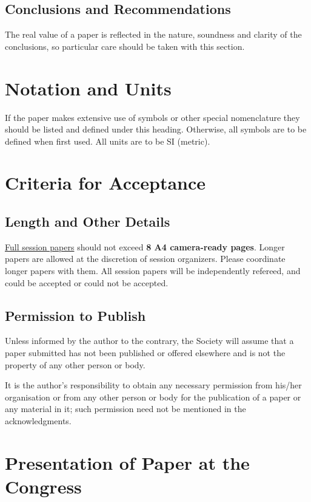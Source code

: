 \documentclass[a4paper]{article}
\begin{document}
\subsection{Conclusions and Recommendations}

The real value of a paper is reflected in the nature, soundness
and clarity of the conclusions, so particular care should be taken
with this section.

\section{Notation and Units}

If the paper makes extensive use of symbols or other special
nomenclature they should be listed and defined under this heading.
Otherwise, all symbols are to be defined when first used.  All
units are to be SI (metric).


\section{Criteria for Acceptance}

\subsection{Length and Other Details}

\underline{Full session papers} should not exceed \textbf{8 A4 camera-ready pages}. Longer papers are allowed at the discretion of session organizers. Please coordinate longer papers with them. All session papers will be independently refereed, and could be accepted or could not be accepted.

\subsection{Permission to Publish}
Unless informed by the author to the contrary, the Society will
assume that a paper submitted has not been published or offered
elsewhere and is not the property of any other person or body.

It is the author's responsibility to obtain any necessary
permission from his/her organisation or from any other person or
body for the publication of a paper or any material in it; such
permission need not be mentioned in the acknowledgments.

\section{Presentation of Paper at the Congress}
\end{document}
